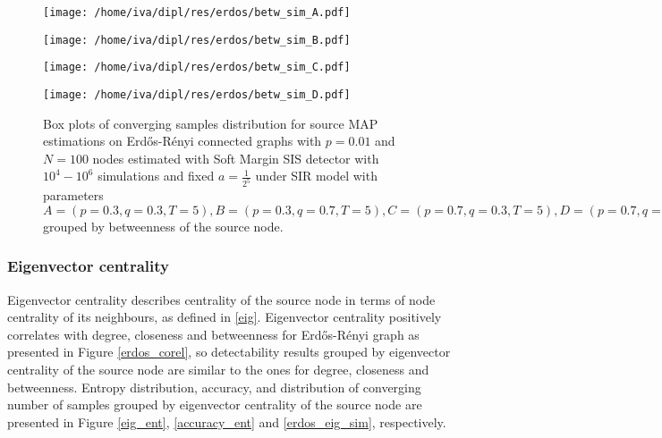 \documentclass[times, utf8, diplomski]{fer}
\begin{document}
\begin{figure}[H]
\begin{minipage}{\textwidth}
\begin{minipage}{0.49\textwidth}
\texttt{[image: /home/iva/dipl/res/erdos/betw\_sim\_A.pdf]}
\end{minipage}
\begin{minipage}{0.49\textwidth}
\texttt{[image: /home/iva/dipl/res/erdos/betw\_sim\_B.pdf]}
\end{minipage}
\begin{minipage}{0.49\textwidth}
\texttt{[image: /home/iva/dipl/res/erdos/betw\_sim\_C.pdf]}
\end{minipage}
\begin{minipage}{0.49\textwidth}
\texttt{[image: /home/iva/dipl/res/erdos/betw\_sim\_D.pdf]}
\end{minipage}
\caption{Box plots of converging samples distribution for source MAP estimations on  Erd{\H{o}}s-R{\'{e}}nyi connected graphs with $p=0.01$ and $N=100$ nodes estimated with Soft Margin SIS detector with $10^4 - 10^6$ simulations and fixed $a = \frac{1}{2^5}$ under SIR model with parameters $A = (p=0.3, q=0.3, T=5), B = (p=0.3, q=0.7, T=5), C = (p=0.7, q=0.3, T=5), D = (p=0.7, q=0.7, T=5)$ grouped by betweenness of the source node.}
\label{betw_sim}
\end{minipage}
\end{figure}

\subsubsection{Eigenvector centrality}

Eigenvector centrality describes centrality of the source node in terms of node centrality of its neighbours, as defined in \ref{eig}. Eigenvector centrality positively correlates with degree, closeness and betweenness for  Erd{\H{o}}s-R{\'{e}}nyi graph as presented in Figure \ref{erdos_corel}, so detectability  results grouped by eigenvector centrality of the source node are similar to the ones for degree, closeness and betweenness. Entropy distribution, accuracy, and distribution of converging number of samples grouped by eigenvector centrality of the source node are presented in Figure \ref{eig_ent}, \ref{accuracy_ent} and \ref{erdos_eig_sim}, respectively.
\end{document}
